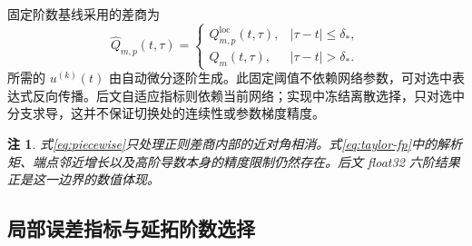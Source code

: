 \documentclass[UTF8,fontset=none,10.5pt,a4paper]{ctexart}
\numberwithin{equation}{section}
\newtheorem{remark}{注}
\begin{document}
固定阶数基线采用的差商为
\begin{equation}
\widehat Q_{m,p}(t,\tau)=
\begin{cases}
Q_{m,p}^{\mathrm{loc}}(t,\tau),&|\tau-t|\le\delta_*,\\
Q_m(t,\tau),&|\tau-t|>\delta_*.
\end{cases}
\label{eq:piecewise}
\end{equation}
所需的 $u^{(k)}(t)$ 由自动微分逐阶生成。此固定阈值不依赖网络参数，可对选中表达式反向传播。后文自适应指标则依赖当前网络；实现中冻结离散选择，只对选中分支求导，这并不保证切换处的连续性或参数梯度精度。

\begin{remark}
式\eqref{eq:piecewise}只处理正则差商内部的近对角相消。式\eqref{eq:taylor-fp}中的解析矩、端点邻近增长以及高阶导数本身的精度限制仍然存在。后文 float32 六阶结果正是这一边界的数值体现。
\end{remark}

\subsection{局部误差指标与延拓阶数选择}
\end{document}

